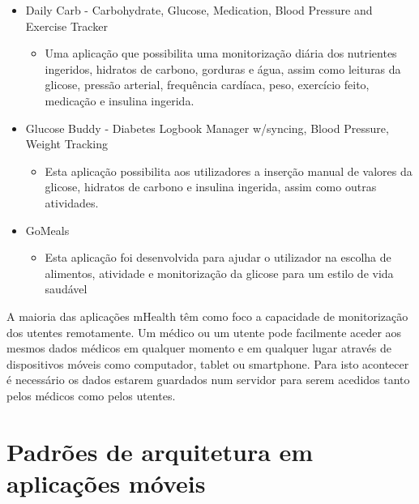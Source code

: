 \begin{itemize}
  \item Daily Carb - Carbohydrate, Glucose, Medication, Blood Pressure and Exercise Tracker \cite{mhealth_app1}
  \begin{itemize}
    \item Uma aplica\c c\~ao que possibilita uma monitoriza\c c\~ao di\'aria dos nutrientes ingeridos, hidratos de carbono, gorduras e \'agua, assim como leituras da glicose, press\~ao arterial, frequ\^encia card\'iaca, peso, exerc\'icio feito, medica\c c\~ao e insulina ingerida.
  \end{itemize}
  \item Glucose Buddy - Diabetes Logbook Manager w/syncing, Blood Pressure, Weight Tracking \cite{mhealth_app2}
   \begin{itemize}
    \item Esta aplica\c c\~ao possibilita aos utilizadores a inser\c c\~ao manual de valores da glicose, hidratos de carbono e insulina ingerida, assim como outras atividades.
  \end{itemize}
  \item GoMeals \cite{mhealth_app3}
     \begin{itemize}
    \item Esta aplica\c c\~ao foi desenvolvida para ajudar o utilizador na escolha de alimentos, atividade e monitoriza\c c\~ao da glicose  para um  estilo de vida saud\'avel
  \end{itemize}
\end{itemize}

A maioria das aplica\c c\~oes mHealth t\^em como foco a capacidade de monitoriza\c c\~ao dos utentes remotamente. Um m\'edico ou um utente pode facilmente aceder aos mesmos dados m\'edicos em qualquer momento e em qualquer lugar atrav\'es de dispositivos m\'oveis como computador, tablet ou smartphone. Para isto acontecer é necessário os dados estarem guardados num servidor para serem acedidos tanto pelos médicos como pelos utentes.








\section{Padrões de arquitetura em aplicações móveis}

